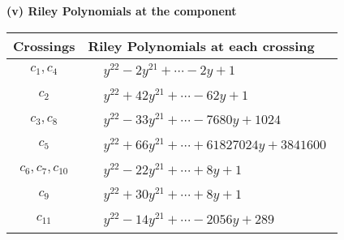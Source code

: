 \documentclass[1p]{elsarticle_modified}
\theoremstyle{definition}
\begin{document}
\newpage\renewcommand{\arraystretch}{1}
\flushleft \textbf{(v) Riley Polynomials at the component}\newline \\
\begin{tabular}{m{50pt}|m{274pt}}
Crossings & \hspace{64pt}Riley Polynomials at each crossing \\
\hline $$\begin{aligned}c_{1},c_{4}\end{aligned}$$&$\begin{aligned}
&y^{22}-2 y^{21}+\cdots-2 y+1
\end{aligned}$\\
\hline $$\begin{aligned}c_{2}\end{aligned}$$&$\begin{aligned}
&y^{22}+42 y^{21}+\cdots-62 y+1
\end{aligned}$\\
\hline $$\begin{aligned}c_{3},c_{8}\end{aligned}$$&$\begin{aligned}
&y^{22}-33 y^{21}+\cdots-7680 y+1024
\end{aligned}$\\
\hline $$\begin{aligned}c_{5}\end{aligned}$$&$\begin{aligned}
&y^{22}+66 y^{21}+\cdots+61827024 y+3841600
\end{aligned}$\\
\hline $$\begin{aligned}c_{6},c_{7},c_{10}\end{aligned}$$&$\begin{aligned}
&y^{22}-22 y^{21}+\cdots+8 y+1
\end{aligned}$\\
\hline $$\begin{aligned}c_{9}\end{aligned}$$&$\begin{aligned}
&y^{22}+30 y^{21}+\cdots+8 y+1
\end{aligned}$\\
\hline $$\begin{aligned}c_{11}\end{aligned}$$&$\begin{aligned}
&y^{22}-14 y^{21}+\cdots-2056 y+289
\end{aligned}$\\
\hline
\end{tabular}\\~\\
\end{document}
